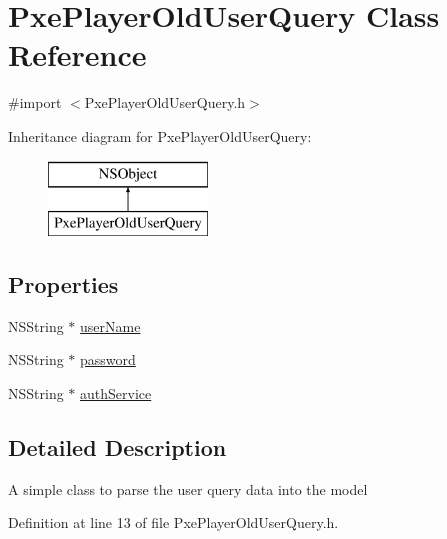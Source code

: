 \hypertarget{interface_pxe_player_old_user_query}{\section{Pxe\-Player\-Old\-User\-Query Class Reference}
\label{interface_pxe_player_old_user_query}
}


{\ttfamily \#import $<$Pxe\-Player\-Old\-User\-Query.\-h$>$}

Inheritance diagram for Pxe\-Player\-Old\-User\-Query\-:\begin{figure}[H]
\begin{center}
\leavevmode
\includegraphics[height=2.000000cm]{interface_pxe_player_old_user_query}
\end{center}
\end{figure}
\subsection*{Properties}
\begin{DoxyCompactItemize}
\item 
N\-S\-String $\ast$ \hyperlink{interface_pxe_player_old_user_query_ab600ae874f1762b3ba3de1d91f057836}{user\-Name}
\item 
N\-S\-String $\ast$ \hyperlink{interface_pxe_player_old_user_query_ae8c668b61248ad659fdc018e1656b370}{password}
\item 
N\-S\-String $\ast$ \hyperlink{interface_pxe_player_old_user_query_ac42b4b905ce3a623ce6e3f46cebdcf78}{auth\-Service}
\end{DoxyCompactItemize}


\subsection{Detailed Description}
A simple class to parse the user query data into the model 

Definition at line 13 of file Pxe\-Player\-Old\-User\-Query.\-h.



